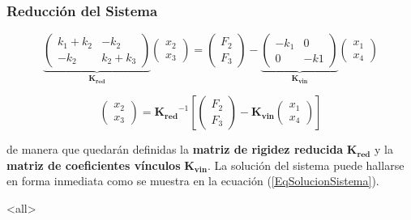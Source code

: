   \begin{frame}[label=FrameSistemaReducido]
    \frametitle<presentation>{Reducción del Sistema}
    \begin{equation}\label{EqSistemaReducido}
      \underbrace{
	\begin{pmatrix} k_1 + k_2 & - k_2 \\ -k_2 & k_2 + k_3 \end{pmatrix}
	}_{ \mathbf{K_{red} } }
	\begin{pmatrix}x_2 \\ x_3\end{pmatrix}
	  = 
	  \begin{pmatrix}F_2 \\ F_3\end{pmatrix}
	    -
	  \underbrace{
	      \begin{pmatrix} -k_1 & 0 \\ 0 & -k1 \end{pmatrix}
	   }_{ \mathbf{ K_{vin} } }
	\begin{pmatrix}x_1 \\ x_4\end{pmatrix}
    \end{equation}

    \begin{equation} \label{EqSolucionSistema}
      \begin{pmatrix} x_2 \\ x_3  \end{pmatrix}
	=
	\mathbf{K_{red}} ^{-1} 
	\left[
      \begin{pmatrix} F_2 \\ F_3  \end{pmatrix}
	- 
	\mathbf{ K_{vin} }
      \begin{pmatrix} x_1 \\ x_4  \end{pmatrix}
	\right]
    \end{equation}

  \end{frame}


de manera que quedarán definidas la \textbf{matriz de rigidez reducida} $\mathbf{K_{red} }$ y la
\textbf{matriz de coeficientes vínculos} $\mathbf{K_{vin}}$. La solución del sistema puede
hallarse en forma inmediata como se muestra en la ecuación (\ref{EqSolucionSistema}).

\mode*

\mode<all>
